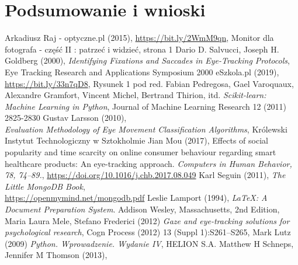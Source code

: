 \documentclass[14pt,a4paper,twoside,openright,titlepage]{extbook}
\begin{document}
    \chapter{Podsumowanie i wnioski}
        
    \backmatter
    \fancyhf{}
    \pagestyle{plain}
    \renewcommand{\headrulewidth}{0pt}
    \begin{thebibliography}{99}
            Arkadiusz Raj - optyczne.pl (2015),
            \url{https://bit.ly/2WmM9qn},
            Monitor dla fotografa - część II : patrzeć i widzieć, strona 1
            Dario D. Salvucci, Joseph H. Goldberg (2000),
            \emph{Identifying Fixations and Saccades in Eye-Tracking Protocols},
            Eye Tracking Research and Applications Symposium 2000
            eSzkola.pl (2019), \url{https://bit.ly/33n7qD8},
            Rysunek 1
            pod red. Fabian Pedregosa, Gael Varoquaux, Alexandre Gramfort, Vincent Michel, Bertrand Thirion, itd.
            \emph{Scikit-learn: Machine Learning in Python},
            Journal of Machine Learning Research 12 (2011) 2825-2830
            Gustav Larsson (2010),\\
            \emph{Evaluation Methodology of Eye
            Movement Classification Algorithms},
            Królewski Instytut Technologiczny w Sztokholmie
            Jian Mou (2017),
            Effects of social popularity and time scarcity on online consumer behaviour regarding smart healthcare products: An eye-tracking approach. \emph{Computers in Human Behavior, 78, 74–89.},
            \url{https://doi.org/10.1016/j.chb.2017.08.049}
            Karl Seguin (2011),
            \emph{The Little MongoDB Book},\\
            \url{https://openmymind.net/mongodb.pdf}
            Leslie Lamport (1994),
            \emph{\LaTeX: A Document Preparation System}.
            Addison Wesley, Massachusetts,
            2nd Edition,
            Maria Laura Mele, Stefano Frederici (2012)
            \emph{Gaze and eye-tracking solutions for psychological research},
            Cogn Process (2012) 13 (Suppl 1):S261–S265,
            Mark Lutz (2009)
            \emph{Python. Wprowadzenie. Wydanie IV},
            HELION S.A.
            Matthew H Schneps, Jennifer M Thomson (2013),

\end{thebibliography}
\end{document}
